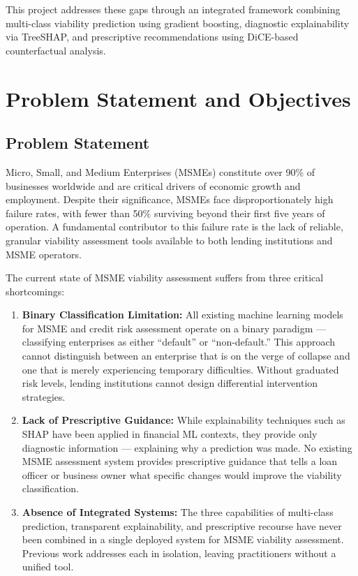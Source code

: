 \documentclass[12pt,a4paper]{report}
\begin{document}
This project addresses these gaps through an integrated framework combining multi-class viability prediction using gradient boosting, diagnostic explainability via TreeSHAP, and prescriptive recommendations using DiCE-based counterfactual analysis.


\chapter{Problem Statement and Objectives}

\section{Problem Statement}

Micro, Small, and Medium Enterprises (MSMEs) constitute over 90\% of businesses worldwide and are critical drivers of economic growth and employment. Despite their significance, MSMEs face disproportionately high failure rates, with fewer than 50\% surviving beyond their first five years of operation. A fundamental contributor to this failure rate is the lack of reliable, granular viability assessment tools available to both lending institutions and MSME operators.

The current state of MSME viability assessment suffers from three critical shortcomings:

\begin{enumerate}
    \item \textbf{Binary Classification Limitation:} All existing machine learning models for MSME and credit risk assessment operate on a binary paradigm --- classifying enterprises as either ``default'' or ``non-default.'' This approach cannot distinguish between an enterprise that is on the verge of collapse and one that is merely experiencing temporary difficulties. Without graduated risk levels, lending institutions cannot design differential intervention strategies.

    \item \textbf{Lack of Prescriptive Guidance:} While explainability techniques such as SHAP have been applied in financial ML contexts, they provide only diagnostic information --- explaining why a prediction was made. No existing MSME assessment system provides prescriptive guidance that tells a loan officer or business owner what specific changes would improve the viability classification.

    \item \textbf{Absence of Integrated Systems:} The three capabilities of multi-class prediction, transparent explainability, and prescriptive recourse have never been combined in a single deployed system for MSME viability assessment. Previous work addresses each in isolation, leaving practitioners without a unified tool.
\end{enumerate}
\end{document}
